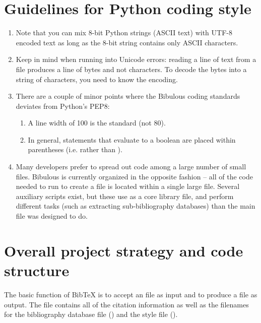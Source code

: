\documentclass[letterpaper,10pt,english]{sphinxmanual}
\begin{document}
\section{Guidelines for Python coding style}
\label{developer_guide:guidelines-for-python-coding-style}\begin{enumerate}
\item {} 
Note that you can mix 8-bit Python strings (ASCII text) with UTF-8 encoded text as long as the 8-bit string contains only ASCII characters.

\item {} 
Keep in mind when running into Unicode errors: reading a line of text from a file produces a line of bytes and not characters. To decode the bytes into a string of characters, you need to know the encoding.

\item {} 
There are a couple of minor points where the Bibulous coding standards deviates from Python's PEP8:
\begin{enumerate}
\item {} 
A line width of 100 is the standard (not 80).

\item {} 
In general, statements that evaluate to a boolean are placed within parentheses (i.e.  rather than ).

\end{enumerate}

\item {} 
Many developers prefer to spread out code among a large number of small files. Bibulous is currently organized in the opposite fashion -- all of the code needed to run  to create a  file is located within a single large file. Several auxiliary scripts exist, but these use  as a core library file, and perform different tasks (such as extracting sub-bibliography databases) than the main file was designed to do.

\end{enumerate}


\section{Overall project strategy and code structure}
\label{developer_guide:overall-project-strategy-and-code-structure}
The basic function of BibTeX is to accept an  file as input and to produce a  file as output. The  file contains all of the citation information as well as the filenames for the bibliography database file () and the style file ().
\end{document}
